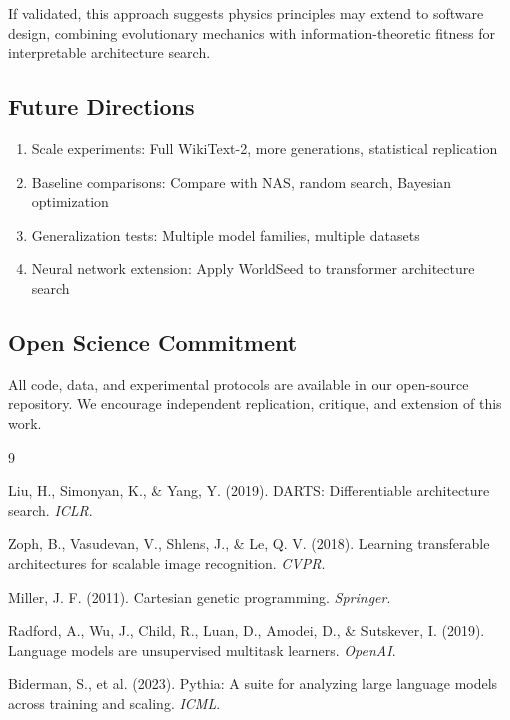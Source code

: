 \documentclass[11pt,a4paper]{article}
\begin{document}
If validated, this approach suggests physics principles may extend to software design, combining evolutionary mechanics with information-theoretic fitness for interpretable architecture search.

\subsection{Future Directions}

\begin{enumerate}
    \item Scale experiments: Full WikiText-2, more generations, statistical replication
    \item Baseline comparisons: Compare with NAS, random search, Bayesian optimization
    \item Generalization tests: Multiple model families, multiple datasets
    \item Neural network extension: Apply WorldSeed to transformer architecture search
\end{enumerate}

\subsection{Open Science Commitment}

All code, data, and experimental protocols are available in our open-source repository. We encourage independent replication, critique, and extension of this work.


\begin{thebibliography}{9}

Liu, H., Simonyan, K., \& Yang, Y. (2019).
DARTS: Differentiable architecture search.
\textit{ICLR}.

Zoph, B., Vasudevan, V., Shlens, J., \& Le, Q. V. (2018).
Learning transferable architectures for scalable image recognition.
\textit{CVPR}.

Miller, J. F. (2011).
Cartesian genetic programming.
\textit{Springer}.

Radford, A., Wu, J., Child, R., Luan, D., Amodei, D., \& Sutskever, I. (2019).
Language models are unsupervised multitask learners.
\textit{OpenAI}.

Biderman, S., et al. (2023).
Pythia: A suite for analyzing large language models across training and scaling.
\textit{ICML}.

\end{thebibliography}
\end{document}
